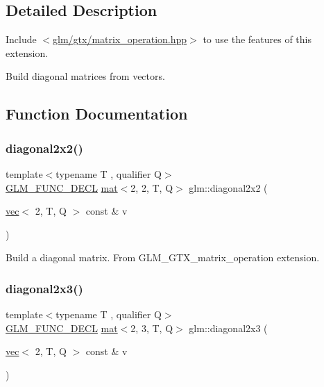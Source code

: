 \subsection{Detailed Description}
Include $<$\mbox{\hyperlink{matrix__operation_8hpp}{glm/gtx/matrix\+\_\+operation.\+hpp}}$>$ to use the features of this extension.

Build diagonal matrices from vectors. 

\subsection{Function Documentation}
\mbox{\label{group__gtx__matrix__operation_ga58a32a2beeb2478dae2a721368cdd4ac}} 
\subsubsection{\texorpdfstring{diagonal2x2()}{diagonal2x2()}}
{\footnotesize\ttfamily template$<$typename T , qualifier Q$>$ \\
\mbox{\hyperlink{setup_8hpp_ab2d052de21a70539923e9bcbf6e83a51}{G\+L\+M\+\_\+\+F\+U\+N\+C\+\_\+\+D\+E\+CL}} \mbox{\hyperlink{structglm_1_1mat}{mat}}$<$2, 2, T, Q$>$ glm\+::diagonal2x2 (\begin{DoxyParamCaption}\item[{\mbox{\hyperlink{structglm_1_1vec}{vec}}$<$ 2, T, Q $>$ const \&}]{v }\end{DoxyParamCaption})}

Build a diagonal matrix. From G\+L\+M\+\_\+\+G\+T\+X\+\_\+matrix\+\_\+operation extension. \mbox{\label{group__gtx__matrix__operation_gab69f900206a430e2875a5a073851e175}} 
\subsubsection{\texorpdfstring{diagonal2x3()}{diagonal2x3()}}
{\footnotesize\ttfamily template$<$typename T , qualifier Q$>$ \\
\mbox{\hyperlink{setup_8hpp_ab2d052de21a70539923e9bcbf6e83a51}{G\+L\+M\+\_\+\+F\+U\+N\+C\+\_\+\+D\+E\+CL}} \mbox{\hyperlink{structglm_1_1mat}{mat}}$<$2, 3, T, Q$>$ glm\+::diagonal2x3 (\begin{DoxyParamCaption}\item[{\mbox{\hyperlink{structglm_1_1vec}{vec}}$<$ 2, T, Q $>$ const \&}]{v }\end{DoxyParamCaption})}

